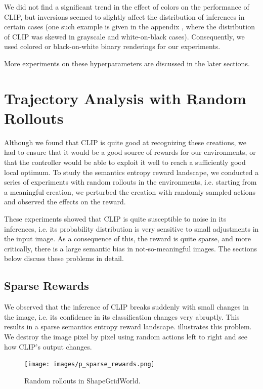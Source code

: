 We did not find a significant trend in the effect of colors on the performance of CLIP, but inversions seemed to slightly affect the distribution of inferences in certain cases
(one such example is given in the appendix , where the distribution of CLIP was skewed in grayscale and white-on-black cases).
Consequently, we used colored or black-on-white binary renderings for our experiments.

More experiments on these hyperparameters are discussed in the later sections.


\section{Trajectory Analysis with Random Rollouts}
\label{sec:clip-problems}
Although we found that CLIP is quite good at recognizing these creations, we had to ensure that it would be a good source of rewards for our environments, or that the controller would be able to exploit it well to reach a sufficiently good local optimum.
To study the semantics entropy reward landscape, we conducted a series of experiments with random rollouts in the environments, i.e. starting from a meaningful creation, we perturbed the creation with randomly sampled actions and observed the effects on the reward.

These experiments showed that CLIP is quite susceptible to noise in its inferences, i.e. its probability distribution is very sensitive to small adjustments in the input image.
As a consequence of this, the reward is quite sparse, and more critically, there is a large semantic bias in not-so-meaningful images.
The sections below discuss these problems in detail.

\subsection{Sparse Rewards} %
\label{sec:sparse-rewards}

We observed that the inference of CLIP breaks suddenly with small changes in the image, i.e. its confidence in its classification changes very abruptly.
This results in a sparse semantics entropy reward landscape.
 illustrates this problem.
We destroy the image pixel by pixel using random actions left to right and see how CLIP's output changes.

\begin{figure}[h]
    \centering
    \texttt{[image: images/p\_sparse\_rewards.png]}
    \caption[Random rollouts in ShapeGridWorld.]{Random rollouts in ShapeGridWorld.}
    \label{fig:sparse-rewards}
\end{figure}

